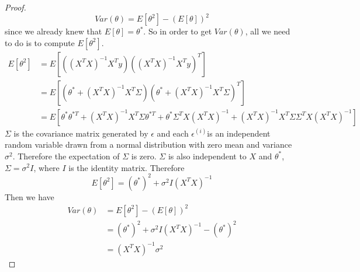 \documentclass[]{book}
\theoremstyle{definition}
\begin{document}
\begin{enumerate}
\begin{proof}
	$$Var(\theta) = E[\theta^2] -(E[\theta])^2$$
	since we already knew that $E[\theta] = \theta^*$. So in order to get $Var(\theta)$, all we need to do is to compute $E[\theta^2]$.
	\begin{equation*}
	\begin{split}
	E[\theta^2] &= E[((X^T X)^{-1} X^T y)((X^T X)^{-1} X^T y)^T]\\
	&=E[(\theta^* + (X^T X)^{-1} X^T\varSigma) (\theta^* + (X^T X)^{-1} X^T\varSigma)^T ]\\
	&=E[\theta^* \theta^{*T} + (X^T X)^{-1} X^T \varSigma \theta^{*T} + \theta^* \varSigma^T X (X^T X)^{-1} + (X^T X)^{-1} X^T \varSigma \varSigma^T X (X^T X)^{-1}]
	\end{split}
	\end{equation*}
	$\varSigma$ is the covariance matrix generated by $\epsilon$ and each $\epsilon^{(i)}$is an independent random variable drawn from a normal distribution with zero mean and variance $\sigma^2$. Therefore the expectation of $\varSigma$ is zero. $\varSigma$ is also independent to $X$ and $\theta^*$, $\varSigma = \sigma^2 I$, where $I$ is the identity matrix. Therefore
	$$ E[\theta^2]= (\theta^*)^2 + \sigma^2 I (X^T X)^{-1}$$
	Then we have 
	\begin{equation*}
	\begin{split}
	Var(\theta) &= E[\theta^2] -(E[\theta])^2\\
	&=(\theta^*)^2 + \sigma^2 I (X^T X)^{-1} -(\theta^*)^2\\
	& =  (X^T X)^{-1} \sigma^2
	\end{split}
	\end{equation*}
\end{proof}
\end{enumerate}

\end{document}
